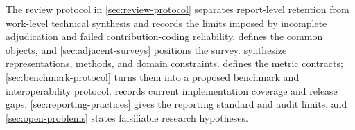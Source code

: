 The review protocol in \cref{sec:review-protocol} separates report-level retention
from work-level technical synthesis and records the limits imposed by incomplete
adjudication and failed contribution-coding reliability. 
defines the common objects, and \cref{sec:adjacent-surveys} positions the survey.
 synthesize
representations, methods, and domain constraints.  defines the
metric contracts; \cref{sec:benchmark-protocol} turns them into a proposed benchmark
and interoperability protocol.  records current
implementation coverage and release gaps, \cref{sec:reporting-practices} gives the
reporting standard and audit limits, and \cref{sec:open-problems} states falsifiable
research hypotheses.
